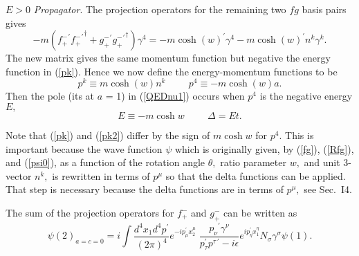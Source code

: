 \documentclass[a4paper,12pt]{article}
\begin{document}
	$E > 0$ {\textit{Propagator}}. The projection operators for the remaining two $fg$ basis pairs gives
\begin{equation}	\label{Epmatrix2}
- m (  {f_{+}^{-}}^{\prime} {{f_{+}^{-}}^{\prime}}^{\dagger}  + {g_{+}^{-}}^{\prime} {{g_{+}^{-}}^{\prime}}^{\dagger} ) \gamma^{4} = -m {\cosh{(w)}}^{\prime} \gamma^{4} - m {\cosh{(w)}}^{\prime}n^{k} \gamma^{k} .
\end{equation}
The new matrix gives the same momentum function but negative the energy function in (\ref{pk}). Hence we now define the energy-momentum functions to be
\begin{equation} \label{pk2}
p^{k} \equiv m \cosh{(w)} n^{k} \hspace{1cm} p^{4} \equiv - m\cosh{(w)} a .
\end{equation}
Then the pole (its at $a$ = 1) in (\ref{QEDnu1}) occurs when $p^{4}$ is the negative energy $E,$
\begin{equation}	\label{E2}
E \equiv - m \cosh{w} \hspace{1cm} \Delta = E t.
\end{equation} 


	Note that (\ref{pk}) and (\ref{pk2}) differ by the sign of $m\cosh{w}$ for $p^{4}.$ This is important because the wave function $\psi$ which is originally given, by (\ref{fg}), (\ref{Rfg}), and (\ref{psi0}), as a function of the rotation angle $\theta,$ ratio parameter $w,$ and unit 3-vector $n^{k},$ is rewritten in terms of $p^{\mu}$ so that the delta functions can be applied. That step is necessary because the delta functions are in terms of $p^{\mu},$ see Sec.~I4.

	The sum of the projection operators for $f_{+}^{-}$ and $g_{+}^{-}$ can be written as
\begin{equation}	\label{QEDnu2}
\psi(2)_{a=c=0} = i\int \frac{d^4 x_{1} d^4 p^{\prime} }{(2 \pi)^4} e^{-ip_{\mu}^{\prime}x_{2}^{\mu}} \; \frac{ {p_{\nu}}^{\prime} \gamma^{\nu}}{p_{\tau}^{\prime}p^{\tau \, \prime}- i\epsilon} e^{ip_{\eta}^{\prime}x_{1}^{\eta}}  N_{\sigma} \gamma^{\sigma} \psi(1).
\end{equation}
\end{document}
